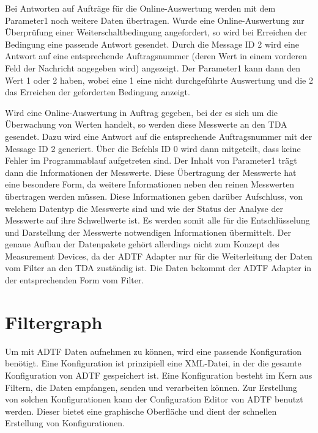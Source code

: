 \documentclass[12pt,a4paper]{report}
\begin{document}
Bei Antworten auf Aufträge für die Online-Auswertung werden mit dem Parameter1 noch weitere Daten übertragen. Wurde eine Online-Auswertung zur Überprüfung einer Weiterschaltbedingung angefordert, so wird bei Erreichen der Bedingung eine passende Antwort gesendet. Durch die Message ID 2 wird eine Antwort auf eine entsprechende Auftragsnummer (deren Wert in einem vorderen Feld der Nachricht angegeben wird) angezeigt. Der Parameter1 kann dann den Wert 1 oder 2 haben, wobei eine 1 eine nicht durchgeführte Auswertung und die 2 das Erreichen der geforderten Bedingung anzeigt.

Wird eine Online-Auswertung in Auftrag gegeben, bei der es sich um die Überwachung von Werten handelt, so werden diese Messwerte an den TDA gesendet. Dazu wird eine Antwort auf die entsprechende Auftragsnummer mit der Message ID 2 generiert. Über die Befehls ID 0 wird dann mitgeteilt, dass keine Fehler im Programmablauf aufgetreten sind. Der Inhalt von Parameter1 trägt dann die Informationen der Messwerte. Diese Übertragung der Messwerte hat eine besondere Form, da weitere Informationen neben den reinen Messwerten übertragen werden müssen. Diese Informationen geben darüber Aufschluss, von welchem Datentyp die Messwerte sind und wie der Status der Analyse der Messwerte auf ihre Schwellwerte ist. Es werden somit alle für die Entschlüsselung und Darstellung der Messwerte notwendigen Informationen übermittelt. Der genaue Aufbau der Datenpakete gehört allerdings nicht zum Konzept des Measurement Devices, da der ADTF Adapter nur für die Weiterleitung der Daten vom Filter an den TDA zuständig ist. Die Daten bekommt der ADTF Adapter in der entsprechenden Form vom Filter.
\section{Filtergraph}\label{sec:Filtergraph}
Um mit ADTF Daten aufnehmen zu können, wird eine passende Konfiguration benötigt. Eine Konfiguration ist prinzipiell eine XML-Datei, in der die gesamte Konfiguration von ADTF gespeichert ist. Eine Konfiguration besteht im Kern aus Filtern, die Daten empfangen, senden und verarbeiten können. Zur Erstellung von solchen Konfigurationen kann der Configuration Editor von ADTF benutzt werden. Dieser bietet eine graphische Oberfläche und dient der schnellen Erstellung von Konfigurationen.
\end{document}

